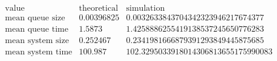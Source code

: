\[\begin{array}{cccc}
 \text{value} & \text{theoretical} & \text{simulation} & \text{} \\
 \text{mean queue size} & 0.00396825 & 0.0032633843704342323946217674377 & \text{} \\
 \text{mean queue time} & 1.5873 & 1.4258886255419138537245650776283 & \text{} \\
 \text{mean system size} & 0.252467 & 0.2341981666879391293849445875685 & \text{} \\
 \text{mean system time} & 100.987 & 102.3295033918014306813655175990083 & \text{} \\
\end{array}\]

